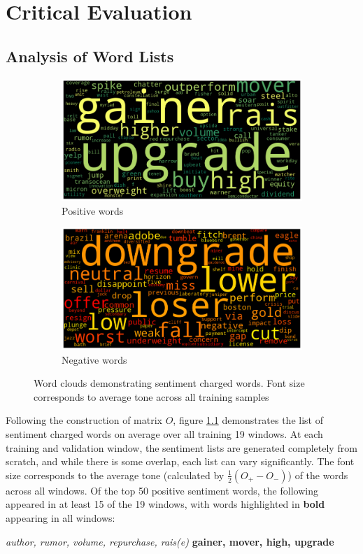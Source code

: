 \chapter{Critical Evaluation}
\label{chap:evaluation}

\section{Analysis of Word Lists}
\begin{figure}[ht]
\begin{subfigure}[b]{\textwidth}
\centering
\includegraphics[scale=0.4]{pics/positive.png}
\caption{Positive words}
\end{subfigure}

\begin{subfigure}[b]{\textwidth}
\centering
\includegraphics[scale=0.4]{pics/negative.png}
\caption{Negative words}
\end{subfigure}
\caption[Word clouds]{Word clouds demonstrating sentiment charged words. Font size corresponds to average tone across all training samples}
\label{wordclouds}
\end{figure}

Following the construction of matrix $O$, figure \ref{wordclouds} demonstrates the list of sentiment charged words on average over all training 19 windows. At each training and validation window, the sentiment lists are generated completely from scratch, and while there is some overlap, each list can vary significantly. The font size corresponds to the average tone (calculated by $\frac{1}{2}(O_+ - O_-)$) of the words across all windows. Of the top 50 positive sentiment words, the following appeared in at least 15 of the 19 windows, with words highlighted in \textbf{bold} appearing in all windows:
\begin{center}
      \textit{author, rumor, volume, repurchase, rais(e)} \textbf{gainer, mover, high, upgrade}
\end{center}

